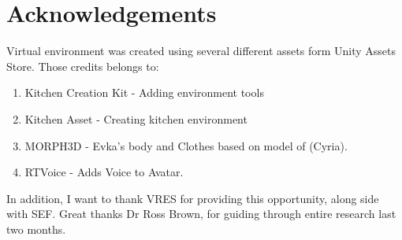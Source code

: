 \documentclass[18pt]{article}
\numberwithin{equation}{section} %
\numberwithin{figure}{section} %
\numberwithin{table}{section} %
\begin{document}
\section{Acknowledgements}	
	Virtual environment was created using several different assets form Unity Assets Store. Those credits belongs to: 
	\begin{enumerate}
		\item Kitchen Creation Kit - Adding environment tools
		\item Kitchen Asset - Creating kitchen environment
		\item MORPH3D - Evka's body and Clothes based on model of (Cyria).
		\item RTVoice - Adds Voice to Avatar.
	\end{enumerate}
	
	In addition, I want to thank VRES for providing this opportunity, along side with SEF. Great thanks Dr Ross Brown, for guiding through entire research last two months. \\	
	
\newpage
\begin{flushleft}



\end{flushleft}
\end{document}
